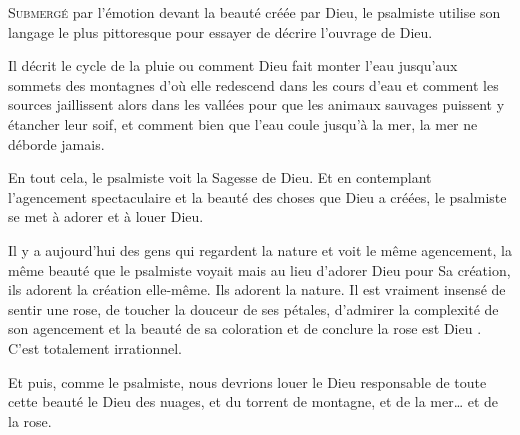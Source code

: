 



\lettrine{S}{ubmergé} par l'émotion devant la beauté créée par Dieu,
 le psalmiste utilise son langage le plus pittoresque pour essayer
 de décrire l'ouvrage de Dieu.

Il décrit le cycle de la pluie ou comment Dieu fait monter l'eau
 jusqu'aux sommets des montagnes d'où elle redescend dans les cours d'eau
 et comment les sources jaillissent alors dans les vallées pour que les animaux
 sauvages puissent y étancher leur soif, et comment bien que l'eau coule
 jusqu'à la mer, la mer ne déborde jamais.

En tout cela, le psalmiste voit la Sagesse de Dieu.
 Et en contemplant l'agencement spectaculaire et la beauté des choses que Dieu
 a créées, le psalmiste se met à adorer et à louer Dieu.

Il y a aujourd'hui des gens qui regardent la nature et voit le même agencement,
 la même beauté que le psalmiste voyait \ocadr{}mais au lieu d'adorer Dieu pour
 Sa création, ils adorent la création elle-même. Ils adorent la nature.
 Il est vraiment insensé de sentir une rose,
 de toucher la douceur de ses pétales, d'admirer la complexité de son agencement
 et la beauté de sa coloration et de conclure \og la rose est Dieu \fg{}.
 C'est totalement irrationnel. 


Et puis, comme le psalmiste, nous devrions louer le Dieu responsable
 de toute cette beauté \ocadr{}le Dieu des nuages, et du torrent de montagne,
 et de la mer\dots{} et de la rose. 

\dvrule





